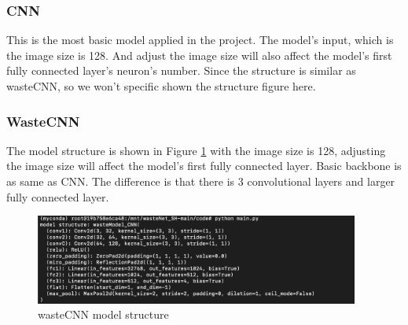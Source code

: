 \documentclass{article}
\begin{document}
        \subsubsection*{CNN}
        This is the most basic model applied in the project. The model's input, which is the image size is 128. And adjust the image size will also affect the model’s first fully connected layer's neuron's number. Since the structure is similar as wasteCNN, so we won't specific shown the structure figure here.

        \subsubsection*{WasteCNN}
        The model structure is shown in Figure \ref{fig:wasteNet_model} with the image size is 128, adjusting the image size will affect the model’s first fully connected layer. Basic backbone is as same as CNN. The difference is that there is 3 convolutional layers and larger fully connected layer.
        \begin{figure}[!h]
            \begin{centering}
            \includegraphics[width=0.95\textwidth]{wasteCNN.png}
            \par\end{centering}
            \caption{wasteCNN model structure}
            \label{fig:wasteNet_model}
        \end{figure}
\end{document}
